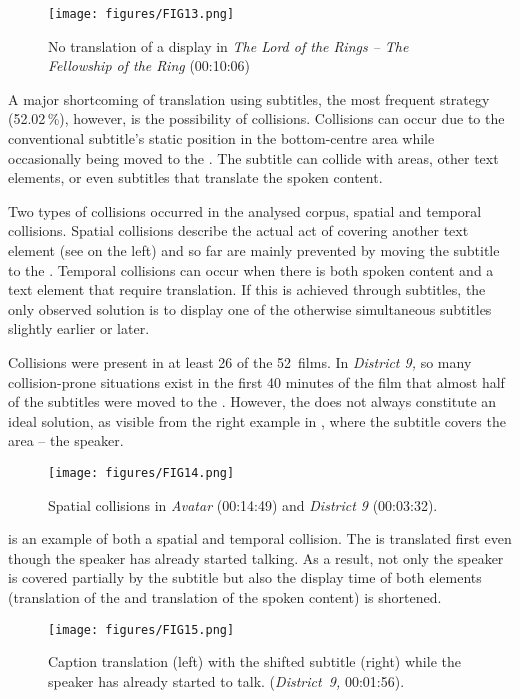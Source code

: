 \begin{figure}
\texttt{[image: figures/FIG13.png]}
\caption{No translation of a display in \textit{The Lord of the Rings – The Fellowship of the Ring} (00:10:06)}
\label{fig:FIG13}
\end{figure}

A major shortcoming of translation using subtitles, the most frequent strategy (52.02\,\%), however, is the possibility of collisions. Collisions can occur due to the conventional subtitle’s static position in the bottom-centre area while occasionally being moved to the . The subtitle can collide with  areas, other text elements, or even subtitles that translate the spoken content.

Two types of collisions occurred in the analysed corpus, spatial and temporal collisions. Spatial collisions describe the actual act of covering another text element (see  on the left) and so far are mainly prevented by moving the subtitle to the . Temporal collisions can occur when there is both spoken content and a text element that require translation. If this is achieved through subtitles, the only observed solution is to display one of the otherwise simultaneous subtitles slightly earlier or later.

Collisions were present in at least 26 of the 52~films. In \textit{District 9,} so many collision-prone situations exist in the first 40 minutes of the film that almost half of the subtitles were moved to the . However, the  does not always constitute an ideal solution, as visible from the right example in , where the subtitle covers the  area – the speaker.

\begin{figure}
\texttt{[image: figures/FIG14.png]}
\caption{Spatial collisions in \textit{Avatar} (00:14:49) and \textit{District 9} (00:03:32).}
\label{fig:FIG14}
\end{figure}

 is an example of both a spatial and temporal collision. The  is translated first even though the speaker has already started talking. As a result, not only the speaker is covered partially by the subtitle but also the display time of both elements (translation of the  and translation of the spoken content) is shortened.

\begin{figure}
\texttt{[image: figures/FIG15.png]}
\caption{Caption translation (left) with the shifted subtitle (right) while the speaker has already started to talk. (\textit{District~9,} 00:01:56).}
\label{fig:FIG15}
\end{figure}

